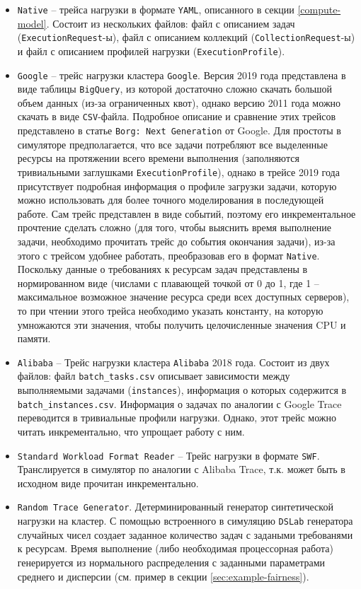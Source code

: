 \begin{itemize}
   \item \texttt{Native} -- трейса нагрузки в формате \texttt{YAML}, описанного в секции \ref{compute-model}. Состоит из нескольких файлов: файл с описанием задач (\texttt{ExecutionRequest}-ы), файл с описанием коллекций (\texttt{CollectionRequest}-ы) и файл с описанием профилей нагрузки (\texttt{ExecutionProfile}).
   \item \texttt{Google} -- трейс нагрузки кластера \texttt{Google}\cite{google-clusterdata}. Версия 2019 года представлена в виде таблицы \texttt{BigQuery}, из которой достаточно сложно скачать большой объем данных (из-за ограниченных квот), однако версию 2011 года можно скачать в виде \texttt{CSV}-файла. Подробное описание и сравнение этих трейсов представлено в статье \texttt{Borg: Next Generation}\cite{borg-next-gen} от Google. Для простоты в симуляторе предполагается, что все задачи потребляют все выделенные ресурсы на протяжении всего времени выполнения (заполняются тривиальными заглушками \texttt{ExecutionProfile}), однако в трейсе 2019 года присутствует подробная информация о профиле загрузки задачи, которую можно использовать для более точного моделирования в последующей работе. Сам трейс представлен в виде событий, поэтому его инкрементальное прочтение сделать сложно (для того, чтобы выяснить время выполнение задачи, необходимо прочитать трейс до события окончания задачи), из-за этого с трейсом удобнее работать, преобразовав его в формат \texttt{Native}. Поскольку данные о требованиях к ресурсам задач представлены в нормированном виде (числами с плавающей точкой от 0 до 1, где 1 -- максимальное возможное значение ресурса среди всех доступных серверов), то при чтении этого трейса необходимо указать константу, на которую умножаются эти значения, чтобы получить целочисленные значения CPU и памяти. 
   \item \texttt{Alibaba} -- Трейс нагрузки кластера \texttt{Alibaba} 2018 года\cite{alibaba-clusterdata}. Состоит из двух файлов: файл \texttt{batch\_tasks.csv} описывает зависимости между выполняемыми задачами (\texttt{instances}), информация о которых содержится в \texttt{batch\_instances.csv}. Информация о задачах по аналогии с Google Trace переводится в тривиальные профили нагрузки. Однако, этот трейс можно читать инкрементально, что упрощает работу с ним.  
   \item \texttt{Standard Workload Format Reader} -- Трейс нагрузки в формате \texttt{SWF}\cite{standard-workload-format}. Транслируется в симулятор по аналогии с Alibaba Trace, т.к. может быть в исходном виде прочитан инкрементально. 
   \item \texttt{Random Trace Generator}. Детерминированный генератор синтетической нагрузки на кластер. С помощью встроенного в симуляцию \texttt{DSLab} генератора случайных чисел создает заданное количество задач с задаными требованями к ресурсам. Время выполнение (либо необходимая процессорная работа) генерируется из нормального распределения с заданными параметрами среднего и дисперсии (см. пример в секции \ref{sec:example-fairness}).

\end{itemize}

